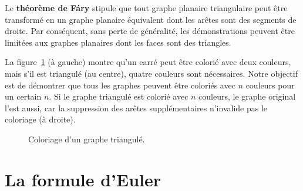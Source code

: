 \begin{advanced}
Le {\bf théorème de F\'{a}ry} stipule que tout graphe planaire triangulaire peut être transformé en un graphe planaire équivalent dont les arêtes sont des segments de droite. Par conséquent, sans perte de généralité, les démonstrations peuvent être limitées aux graphes planaires dont les faces sont des triangles.
\end{advanced}

\begin{example}
La figure~\ref{f.five-triangular-graph} (à gauche) montre qu'un carré peut être colorié avec deux couleurs, mais s'il est triangulé (au centre), quatre couleurs sont nécessaires. Notre objectif est de démontrer que tous les graphes peuvent être coloriés avec $n$ couleurs pour un certain $n$. Si le graphe triangulé est colorié avec $n$ couleurs, le graphe original l'est aussi, car la suppression des arêtes supplémentaires n'invalide pas le coloriage (à droite).
\end{example}

\begin{figure}[htbp]
\centering
{}
\caption{Coloriage d'un graphe triangulé.}
\label{f.five-triangular-graph}
\end{figure}

\section{La formule d'Euler}\label{s.euler}


